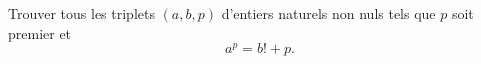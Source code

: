 Trouver tous les triplets $(a, b, p)$ d'entiers naturels non nuls tels que $p$ soit premier et
\[
a^p = b! + p.
\]
